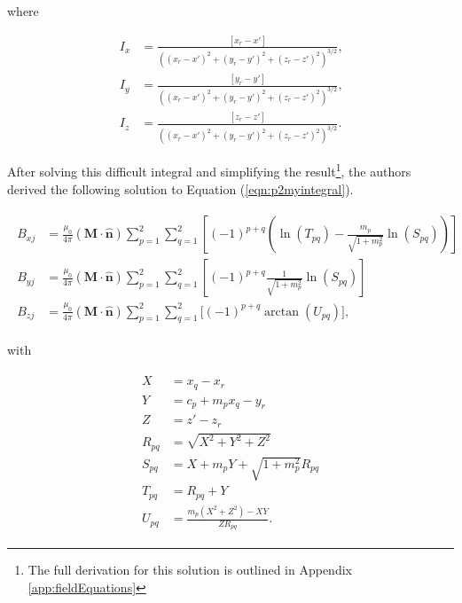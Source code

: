 \noindent where

\begin{align}
	I_x &= \frac{\left[x_r-x'\right]}{\left(\left(x_r-x'\right)^2+\left(y_r-y'\right)^2+\left(z_r-z'\right)^2\right)^{3/2}} \text{,} \nonumber \\
	I_y &=  \frac{\left[y_r-y'\right]}{\left(\left(x_r-x'\right)^2+\left(y_r-y'\right)^2+\left(z_r-z'\right)^2\right)^{3/2}} \text{,} \\
	I_z &=  \frac{\left[z_r-z'\right]}{\left(\left(x_r-x'\right)^2+\left(y_r-y'\right)^2+\left(z_r-z'\right)^2\right)^{3/2}} \text{.} \nonumber
\end{align}

After solving this difficult integral and simplifying the result\footnote{The full derivation for this solution is outlined in Appendix \ref{app:fieldEquations}}, the authors derived the following solution to Equation (\ref{eqn:p2myintegral}).

\begin{align}\label{eqn:p2fieldequation}
\begin{split}
B_{xj} &= \frac{\mu_0}{4\pi} \left(\mathbf{M} \cdot \hat{\mathbf{n}}\right) \sum_{p=1}^2 \sum_{q=1}^2 \left[ \left( -1 \right) ^{p+q} \left( \ln \left( T_{pq} \right) - \frac{m_p}{\sqrt{1+m_p^2}} \ln \left(S_{\!pq}\right) \right) \right] \\
B_{yj} &= \frac{\mu_0}{4\pi} \left(\mathbf{M} \cdot \hat{\mathbf{n}}\right) \sum_{p=1}^2 \sum_{q=1}^2 \left[ \left( -1 \right)^{p+q} \frac{1}{\sqrt{1+m_p^2}} \ln \left( S_{\!pq} \right) \right] \\
B_{zj} &= \frac{\mu_0}{4\pi} \left(\mathbf{M} \cdot \hat{\mathbf{n}}\right) \sum_{p=1}^2 \sum_{q=1}^2 \Bigg[ \left( -1 \right) ^{p+q} \arctan \left( U_{pq} \right) \Bigg] \text{,}
\end{split}
\end{align}

\noindent with

\begin{align}\label{eqn:p2intermediatevars}
\begin{split}
X &= x_q - x_r \\
Y &= c_p + m_px_q - y_r \\
Z &= z' - z_r \\
R_{pq} &= \sqrt{X^2 + Y^2 + Z^2} \\
S_{\!pq} &= X + m_pY + \sqrt{1+m_p^2}R_{pq} \\
T_{pq} &= R_{pq} + Y \\
U_{pq} &= \frac{m_p\left(X^2+Z^2\right)-XY}{ZR_{pq}} \text{.}
\end{split}
\end{align}

